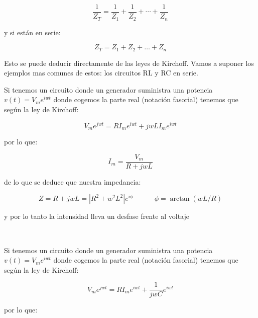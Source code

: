 \documentclass[12pt]{article}
\newcommand{\tquad}{\quad \quad \quad}
\begin{document}
\begin{equation}
\dfrac{1}{Z_T} = \dfrac{1}{Z_1} + \dfrac{1}{Z_2} + \cdots + \dfrac{1}{Z_n}
\end{equation}

y si están en serie:

\begin{equation}
Z_T = Z_1 + Z_2 + \ldots + Z_n
\end{equation}

Esto se puede deducir directamente de las leyes de Kirchoff. Vamos a suponer los ejemplos mas comunes de estos: los circuitos RL y RC en serie.  \\


\hrulefill

Si tenemos un circuito donde un generador suministra una potencia $v(t) = V_m e^{iwt}$ donde cogemos la parte real (notación fasorial) tenemos que según la ley de Kirchoff:

\begin{equation}
V_m e^{jwt} = R I_m e^{iwt} + jwLI_m e^{iwt} 
\end{equation}

por lo que:



\begin{equation}
I_m = \dfrac{V_m}{R + jwL}
\end{equation}

de lo que se deduce que nuestra impedancia:

\begin{equation}
Z = R + jwL = |R^2 + w^2 L^2| e^{i \phi} \tquad \phi = \arctan(wL/R)
\end{equation}

y por lo tanto la intensidad lleva un desfase frente al voltaje

\hrulefill \\



\hrulefill 

Si tenemos un circuito donde un generador suministra una potencia $v(t) = V_m e^{iwt}$ donde cogemos la parte real (notación fasorial) tenemos que según la ley de Kirchoff:

\begin{equation}
V_m e^{jwt} = R I_m e^{iwt} + \dfrac{1}{jwC} e^{iwt} 
\end{equation}

por lo que:
\end{document}
